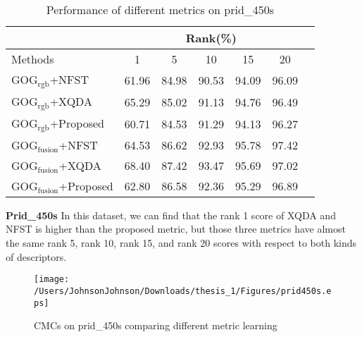 \begin{table}[H]
\caption{Performance of different metrics on prid\_450s}
\centering
\begin{tabular}{|l|c|c|c|c|c|c|}
\hline
& \multicolumn{5}{|c|}{Rank(\%)} \\
\hline
Methods& 1 & 5 &10& 15&20\\
\hline
GOG$_\text{rgb}$+NFST& 61.96&84.98 &90.53& 94.09&96.09 \\  %
\hline
GOG$_\text{rgb}$+XQDA&65.29 &85.02 & 91.13&94.76& 96.49\\ 
\hline
GOG$_\text{rgb}$+Proposed&60.71&84.53&91.29&94.13&96.27\\  %
\hline
GOG$_\text{fusion}$+NFST& 64.53&86.62 & 92.93&95.78&97.42 \\ 
\hline
GOG$_\text{fusion}$+XQDA&68.40 & 87.42&93.47 &95.69& 97.02\\ 
\hline
GOG$_\text{fusion}$+Proposed&62.80&86.58&92.36&95.29& 96.89\\ %

\hline

\end{tabular}
\end{table}
\textbf{Prid\_450s} In this dataset, we can find that the rank 1 score of XQDA and NFST is higher than the proposed metric, but those three metrics have almost the same rank 5, rank 10, rank 15, and rank 20 scores with respect to both kinds of descriptors.  

\begin{figure}[H]
\begin{raggedleft}
\texttt{[image: /Users/JohnsonJohnson/Downloads/thesis\_1/Figures/prid450s.eps]}
\vspace{-3em}
\caption{CMCs on prid\_450s comparing different metric learning}
\end{raggedleft}
\end{figure}

